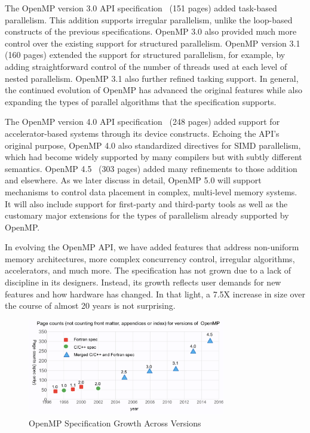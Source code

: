 The OpenMP version 3.0 API specification~\cite{openmp3} (151 pages) added
task-based parallelism. This addition supports irregular parallelism, unlike the
loop-based constructs of the previous specifications. OpenMP 3.0 also provided
much more control over the existing support for structured parallelism. OpenMP
version 3.1~\cite{openmp31} (160 pages) extended the support for structured parallelism, for
example, by adding straightforward control of the number of threads used at each
level of nested parallelism. OpenMP 3.1 also further refined tasking support. In
general, the continued evolution of OpenMP has advanced the original features
while also expanding the types of parallel algorithms that the specification
supports.

The OpenMP version 4.0 API specification~\cite{openmp4} (248 pages) added support for 
accelerator-based systems through its device constructs. Echoing the API's 
original purpose, OpenMP 4.0 also standardized directives for SIMD 
parallelism, which had become widely supported by many compilers but 
with subtly different semantics. OpenMP 4.5~\cite{openmp45} (303 pages) added many 
refinements to those addition and elsewhere. As we later discuss in 
detail, OpenMP 5.0 will support mechanisms to control data placement in
complex, multi-level memory systems. It will also include support for
first-party and third-party tools as well as the customary major 
extensions for the types of parallelism already supported by OpenMP.

In evolving the OpenMP API, we have added features that address 
non-uniform memory architectures, more complex concurrency control, 
irregular algorithms, accelerators, and much more. The specification 
has not grown due to a lack of discipline in its designers. Instead,
its growth reflects user demands for new features and how hardware 
has changed. In that light, a 7.5X increase in size over the course 
of almost 20 years is not surprising.

\begin{figure}
  \centering
  \includegraphics[width=3.4in]{pics/opcounts.png}
  \caption{OpenMP Specification Growth Across Versions}
  \label{omppcount}
\end{figure}



